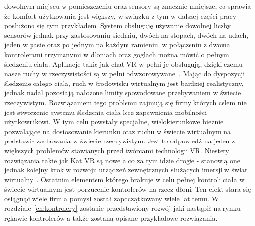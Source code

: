 dowolnym miejscu w pomieszczeniu oraz sensory są znacznie mniejsze, co sprawia że komfort użytkowania jest większy, w związku z tym w dalszej części pracy posłużono się tym przykładem. System obsługuję używanie dowolnej liczby sensorów jednak przy zastosowaniu siedmiu, dwóch na stopach, dwóch na udach, jeden w pasie oraz po jednym na każdym ramieniu, w połączeniu z dwoma kontrolerami trzymanymi w dłoniach oraz goglach można mówić o pełnym śledzeniu ciała. Aplikacje takie jak chat VR w pełni je obsługują, dzięki czemu nasze ruchy w rzeczywistości są w pełni odwzorowywane~\cite{body}. Mając do dyspozycji śledzenie całego ciała, ruch w środowisku wirtualnym jest bardziej realistyczny, jednak nadal pozostają nałożone limity spowodowane przebywaniem w świecie rzeczywistym. Rozwiązaniem tego problemu zajmują się firmy których celem nie jest stworzenie systemu śledzenia ciała lecz zapewnienia mobilności użytkownikowi. W tym celu powstały specjalne, wielokierunkowe bieżnie pozwalające na dostosowanie kierunku oraz ruchu w świecie wirtualnym na podstawie zachowania w świecie rzeczywistym. Jest to odpowiedź na jeden z większych problemów stawianych przed twórcami technologii VR. Niestety rozwiązania takie jak Kat VR są nowe a co za tym idzie drogie - stanowią one jednak kolejny krok w rozwoju urządzeń zewnętrznych służących imersji w świat wirtualny~\cite{cat}. Ostatnim elementem którego brakuje w celu pełnej kontroli ciała w świecie wirtualnym jest porzucenie kontrolerów na rzecz dłoni. Ten efekt stara się osiągnąć wiele firm a pomysł został zapoczątkowany wiele lat temu. W rozdziale~\ref{ch:kontrolery} zostanie przedstawiony rozwój jaki nastąpił na rynku rękawic kontrolerów  a także zostaną opisane przykładowe rozwiązania.